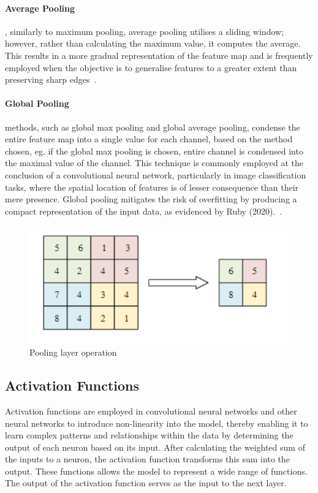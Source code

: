 \paragraph{Average Pooling}
, similarly to maximum pooling, average pooling utilises a sliding window; however, rather than
calculating the maximum value, it computes the average. This results in a more gradual
representation of the feature map and is frequently employed when the objective is to generalise
features to a greater extent than preserving sharp edges~\cite{GU2018354}.


\paragraph{Global Pooling}
methods, such as global max pooling and global average pooling, condense the entire feature map into a single value for each channel,
based on the method chosen, eg. if the global max pooling is chosen, entire channel is condensed into the maximal value of the channel.
This technique is commonly employed at the conclusion of a convolutional neural network, particularly in image classification tasks, where the spatial location of features is of lesser consequence than their mere presence. Global pooling mitigates the risk of overfitting by producing a compact representation of the input data, as evidenced by Ruby (2020).~\cite{GU2018354}.


\begin{figure}[h]
\centering
\includegraphics[width=.50\textwidth]{figures/pooling}
\caption{Pooling layer operation~\cite{article}}
\label{fig:pooling}
\end{figure}



\subsection{Activation Functions}\label{subsec:activation-functions}

Activation functions are employed in convolutional neural networks and other neural networks to introduce non-linearity into the model,
thereby enabling it to learn complex patterns and relationships within the data by determining the output of each neuron based on its input.
After calculating the weighted sum of the inputs to a neuron, the activation function transforms this sum into the output. These functions allows the model to represent a wide range of functions.
The output of the activation function serves as the input to the next layer.

